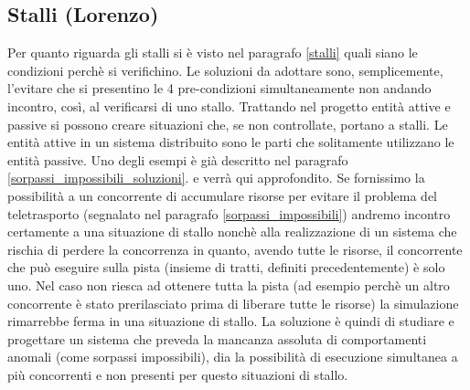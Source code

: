 \subsection{Stalli (Lorenzo)}
Per quanto riguarda gli stalli si \`{e} visto nel paragrafo \ref{stalli} quali
siano le condizioni perch\`{e} si verifichino. Le soluzioni da adottare sono,
semplicemente, l'evitare che si presentino le 4 pre-condizioni simultaneamente
non andando incontro, cos\`{i}, al verificarsi di uno stallo.
Trattando nel progetto entit\`{a} attive e passive si possono creare situazioni
che, se non controllate, portano a stalli. Le entit\`{a} attive in un sistema
distribuito sono le parti che solitamente utilizzano le entit\`{a} passive. Uno
degli esempi \`{e} gi\`{a} descritto nel paragrafo
\ref{sorpassi_impossibili_soluzioni}. e verr\`{a} qui approfondito. Se
fornissimo la possibilit\`{a} a un concorrente  di accumulare risorse per
evitare il problema del teletrasporto (segnalato nel paragrafo
\ref{sorpassi_impossibili}) andremo incontro certamente a una situazione di
stallo nonch\`{e} alla realizzazione di un sistema che rischia di perdere la
concorrenza in quanto, avendo tutte le risorse, il concorrente che pu\`{o}
eseguire sulla pista (insieme di tratti, definiti precedentemente) \`{e} solo
uno. Nel caso non riesca ad ottenere tutta la pista (ad esempio perch\`{e} un
altro concorrente \`{e} stato prerilasciato prima di liberare tutte le risorse)
la simulazione rimarrebbe ferma in una situazione di stallo. La soluzione \`{e}
quindi di studiare e progettare un sistema che preveda la mancanza assoluta di
comportamenti anomali (come sorpassi impossibili), dia la possibilit\`{a} di
esecuzione simultanea a pi\`{u} concorrenti e non presenti per questo situazioni
di stallo.
